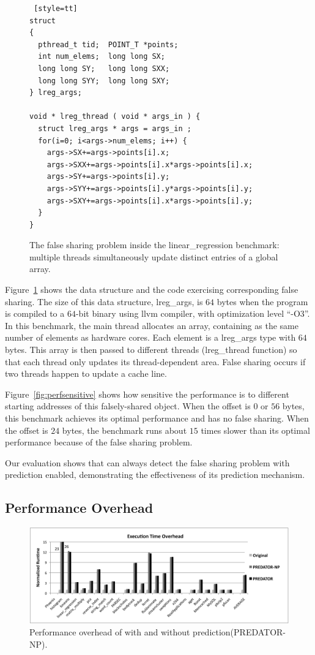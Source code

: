\begin{figure}
\begin{lstlisting} [style=tt]
struct
{
  pthread_t tid;  POINT_T *points;
  int num_elems;  long long SX;
  long long SY;   long long SXX;
  long long SYY;  long long SXY;
} lreg_args;

void * lreg_thread ( void * args_in ) {
  struct lreg_args * args = args_in ;
  for(i=0; i<args->num_elems; i++) {
    args->SX+=args->points[i].x;
    args->SXX+=args->points[i].x*args->points[i].x;
    args->SY+=args->points[i].y;
    args->SYY+=args->points[i].y*args->points[i].y;
    args->SXY+=args->points[i].x*args->points[i].y;
  }
}
\end{lstlisting}
\caption{The false sharing problem inside the linear\_regression benchmark: multiple threads simultaneously update distinct entries of a global array.
\label{fig:linearregression}}
\end{figure}

Figure~\ref{fig:linearregression} shows the data structure and the code exercising corresponding false sharing. The size of this data structure, lreg\_args, is $64$ bytes 
when the program is compiled to a $64$-bit binary using llvm compiler, with optimization level ``-O3''. In this benchmark, the main thread allocates an array, containing as the same number of elements as hardware cores. Each element is a lreg\_args type with $64$ bytes. This array is then passed to different threads (lreg\_thread function) so that each thread only updates its thread-dependent area. False sharing occurs if two threads happen to update a cache line. 

Figure~\ref{fig:perfsensitive} shows how sensitive the performance is to different starting addresses of this falsely-shared object. When the offset is $0$ or $56$ bytes, this benchmark achieves its optimal performance and has no false sharing. When the offset is $24$ bytes, the benchmark runs about $15$ times slower than its optimal performance because of the false sharing problem.

Our evaluation shows that \Predator{} can always detect the false sharing problem with prediction enabled, demonstrating the effectiveness of its prediction mechanism.

\subsection{Performance Overhead}
\label{sec:perfoverhead}

\begin{figure}[!t]
\centering
\includegraphics[width=6in]{predator/figure/perf}
\caption{
Performance overhead of \Predator{} with and without prediction(PREDATOR-NP).
\label{fig:perf}}
\end{figure}


